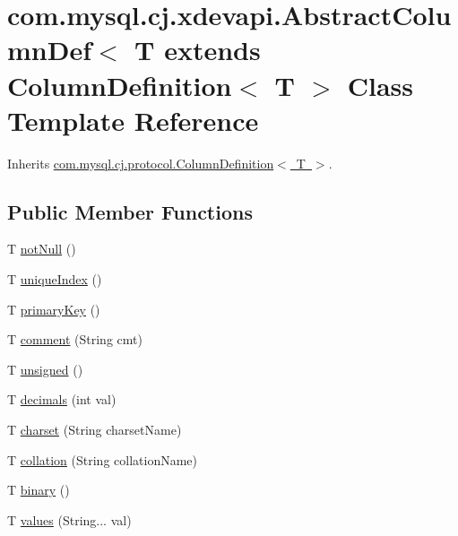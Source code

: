 \hypertarget{classcom_1_1mysql_1_1cj_1_1xdevapi_1_1_abstract_column_def}{}\section{com.\+mysql.\+cj.\+xdevapi.\+Abstract\+Column\+Def$<$ T extends Column\+Definition$<$ T $>$ Class Template Reference}
\label{classcom_1_1mysql_1_1cj_1_1xdevapi_1_1_abstract_column_def}


Inherits \mbox{\hyperlink{interfacecom_1_1mysql_1_1cj_1_1protocol_1_1_column_definition}{com.\+mysql.\+cj.\+protocol.\+Column\+Definition$<$ T $>$}}.

\subsection*{Public Member Functions}
\begin{DoxyCompactItemize}
\item 
T \mbox{\hyperlink{classcom_1_1mysql_1_1cj_1_1xdevapi_1_1_abstract_column_def_aeae3341e23e3d78d7f43cc18aed47265}{not\+Null}} ()
\item 
T \mbox{\hyperlink{classcom_1_1mysql_1_1cj_1_1xdevapi_1_1_abstract_column_def_a6b005a70236307ef894d31446ad22954}{unique\+Index}} ()
\item 
T \mbox{\hyperlink{classcom_1_1mysql_1_1cj_1_1xdevapi_1_1_abstract_column_def_a4d84c108b3cc2b67fcb9aa52b16c3716}{primary\+Key}} ()
\item 
T \mbox{\hyperlink{classcom_1_1mysql_1_1cj_1_1xdevapi_1_1_abstract_column_def_a418c217117b75a152071102d3fa092bb}{comment}} (String cmt)
\item 
T \mbox{\hyperlink{classcom_1_1mysql_1_1cj_1_1xdevapi_1_1_abstract_column_def_a409637118254f8a15d86b22428117146}{unsigned}} ()
\item 
T \mbox{\hyperlink{classcom_1_1mysql_1_1cj_1_1xdevapi_1_1_abstract_column_def_a86ae5ea61f8d0de3576b024c6e8a8a38}{decimals}} (int val)
\item 
T \mbox{\hyperlink{classcom_1_1mysql_1_1cj_1_1xdevapi_1_1_abstract_column_def_ac2b2f3a49740b1fc7524858838bc1538}{charset}} (String charset\+Name)
\item 
T \mbox{\hyperlink{classcom_1_1mysql_1_1cj_1_1xdevapi_1_1_abstract_column_def_a12516ef6518ca1be210f3fc715d21313}{collation}} (String collation\+Name)
\item 
T \mbox{\hyperlink{classcom_1_1mysql_1_1cj_1_1xdevapi_1_1_abstract_column_def_ab0a33d432060ea2c41dc221435eaaa59}{binary}} ()
\item 
T \mbox{\hyperlink{classcom_1_1mysql_1_1cj_1_1xdevapi_1_1_abstract_column_def_a707a799028bb4075fae6548a272cc310}{values}} (String... val)
\end{DoxyCompactItemize}
